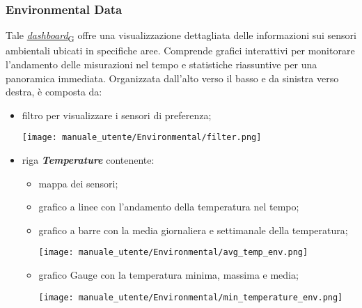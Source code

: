\subsubsection{Environmental Data}
Tale \href{https://7last.github.io/docs/pb/documentazione-interna/glossario\#dashboard}{\textit{dashboard}\textsubscript{G}} offre una visualizzazione dettagliata delle informazioni sui sensori ambientali ubicati in specifiche aree. Comprende grafici interattivi per monitorare l'andamento delle misurazioni nel tempo e statistiche riassuntive per una panoramica immediata. Organizzata dall'alto verso il basso e da sinistra verso destra, è composta da:
\begin{itemize}
    \item filtro per visualizzare i sensori di preferenza;
    \begin{center}
        \texttt{[image: manuale\_utente/Environmental/filter.png]}
    \end{center}
    \item riga \textit{\textbf{Temperature}} contenente:
    \begin{itemize}
        \item mappa dei sensori; %
        \item grafico a linee con l'andamento della temperatura nel tempo; %
        \item grafico a barre con la media giornaliera e settimanale della temperatura;
        \begin{center}
            \texttt{[image: manuale\_utente/Environmental/avg\_temp\_env.png]}
        \end{center}
        \item grafico Gauge con la temperatura minima, massima e media;
        \begin{center}
            \texttt{[image: manuale\_utente/Environmental/min\_temperature\_env.png]}
        \end{center}
    \end{itemize}


\end{itemize}
